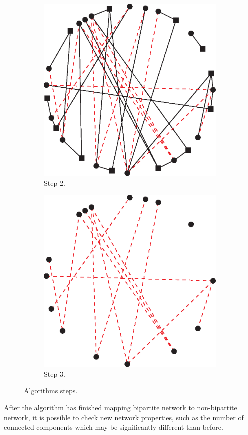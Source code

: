 \begin{figure}[h]
\begin{subfigure}[b]{0.3\textwidth}
          \includegraphics[width=\textwidth]{chapters/03_implementation/cs_motif_2}
          \caption{Step 2.}
        \end{subfigure}
        \quad
        \begin{subfigure}[b]{0.3\textwidth}
          \includegraphics[width=\textwidth]{chapters/03_implementation/cs_motif_3}
          \caption{Step 3.}
        \end{subfigure}
        \caption{Algorithms steps.}
        \label{fig:cs_motifs}
      \end{figure}
      
      After the algorithm has finished mapping bipartite network to non-bipartite network, it is possible to check new network properties, such as the number of connected components which may be significantly different than before.